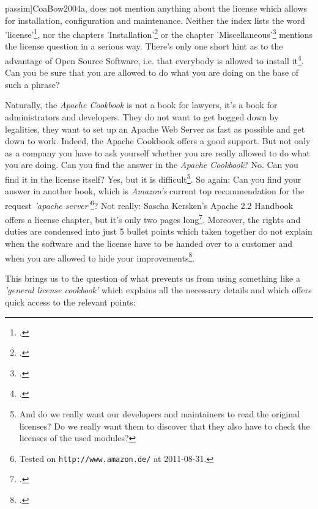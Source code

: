 passim]{CoaBow2004a}, does not mention anything about the license which allows
for installation, configuration and maintenance. Neither the index lists the
word 'license'\footcite[cf.][245ff, esp. p. 250]{CoaBow2004a}, nor the chapters
'Installation'\footcite[cf.][1ff]{CoaBow2004a} or the chapter
'Miscellaneous'\footcite[cf.][219ff]{CoaBow2004a} mentions the license question
in a serious way. There's only one short hint as to the advantage of Open Source
Software, i.e. that everybody is allowed to install it\footcite[cf.][1: \enquote{
\ldots einer der Vorzüge von Open Source Software besteht darin, dass
je\-der\-mann die Erlaubnis zur Erzeugung eines eigenen Installationskits hat
}]{CoaBow2004a}. Can you be sure that you are allowed to do what you are
doing on the base of such a phrase?

Naturally, the \emph{Apache Cookbook} is not a book for lawyers, it's a book for
administrators and developers. They do not want to get bogged down by
legalities, they want to set up an Apache Web Server as fast as possible and get
down to work. Indeed, the Apache Cookbook offers a good support. But not only as
a company you have to ask yourself whether you are really allowed to do what you
are doing. Can you find the answer in the \emph{Apache Cookbook}? No. Can you
find it in the license itself? Yes, but it is difficult\footnote{And do we
really want our developers and maintainers to read the original licenses? Do we
really want them to discover that they also have to check the licenses of the
used modules?}. So again: Can you find your answer in another book, which is
\emph{Amazon's} current top recommendation for the request \emph{'apache
server'}\footnote{Tested on \texttt{http://www.amazon.de/} at 2011-08-31.}? Not
really: Sascha Kersken's Apache 2.2 Handbook offers a license chapter, but it's
only two pages long\footcite[cf.][111f]{Kersken2009a}. Moreover, the rights and
duties are condensed into just 5 bullet points which taken together do not
explain when the software and the license have to be handed over to a customer
and when you are allowed to hide your
improvements\footcite[cf.][112]{Kersken2009a}.

This brings us to the question of what prevents us from using something like a
\emph{'general license cookbook'} which explains all the necessary details and
which offers  quick access to the relevant points:


